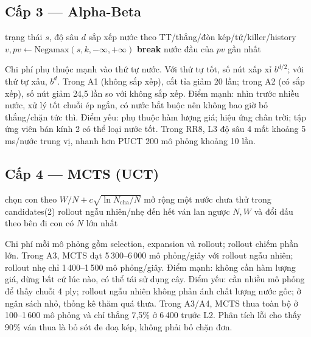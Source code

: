 \subsection{Cấp 3 --- Alpha-Beta}
\begin{algorithm}[H]
  \caption{AlphaBetaAgent (Negamax + cắt tỉa + TT)}
  \begin{algorithmic}[1]
    \REQUIRE trạng thái $s$, độ sâu $d$
      \STATE sắp xếp nước theo TT/thắng/đòn kép/tứ/killer/history
      \STATE $v, pv \leftarrow \text{Negamax}(s, k, -\infty, +\infty)$
        \STATE \textbf{break}
      \ENDIF
    \ENDFOR
    \RETURN nước đầu của $pv$ gần nhất
  \end{algorithmic}
\end{algorithm}
Chi phí phụ thuộc mạnh vào thứ tự nước. Với thứ tự tốt, số nút xấp xỉ $b^{d/2}$; với thứ tự
xấu, $b^d$. Trong A1 (không sắp xếp), cắt tỉa giảm 20 lần; trong A2 (có sắp xếp), số nút giảm
24,5 lần so với không sắp xếp. Điểm mạnh: nhìn trước nhiều nước, xử lý tốt chuỗi ép ngắn, có
nước bắt buộc nên không bao giờ bỏ thắng/chặn tức thì. Điểm yếu: phụ thuộc hàm lượng giá; hiệu
ứng chân trời; tập ứng viên bán kính 2 có thể loại nước tốt. Trong RR8, L3 độ sâu 4 mất khoảng
5 ms/nước trung vị, nhanh hơn PUCT 200 mô phỏng khoảng 10 lần.

\subsection{Cấp 4 --- MCTS (UCT)}
\begin{algorithm}[H]
  \caption{MCTSAgent (UCT)}
  \begin{algorithmic}[1]
      \STATE chọn con theo $W/N + c\sqrt{\ln N_{\text{cha}}/N}$
      \STATE mở rộng một nước chưa thử trong candidates(2)
      \STATE rollout ngẫu nhiên/nhẹ đến hết ván
      \STATE lan ngược $N, W$ và đổi dấu theo bên đi
    \ENDFOR
    \RETURN con có $N$ lớn nhất
  \end{algorithmic}
\end{algorithm}
Chi phí mỗi mô phỏng gồm selection, expansion và rollout; rollout chiếm phần lớn. Trong A3,
MCTS đạt 5\,300--6\,000 mô phỏng/giây với rollout ngẫu nhiên; rollout nhẹ chỉ 1\,400--1\,500
mô phỏng/giây. Điểm mạnh: không cần hàm lượng giá, dừng bất cứ lúc nào, có thể tái sử dụng cây.
Điểm yếu: cần nhiều mô phỏng để thấy chuỗi 4 ply; rollout ngẫu nhiên không phản ánh chất lượng
nước gốc; ở ngân sách nhỏ, thống kê thăm quá thưa. Trong A3/A4, MCTS thua toàn bộ ở 100--1\,600
mô phỏng và chỉ thắng 7,5\% ở 6\,400 trước L2. Phân tích lỗi cho thấy 90\% ván thua là bỏ sót
đe doạ kép, không phải bỏ chặn đơn.

